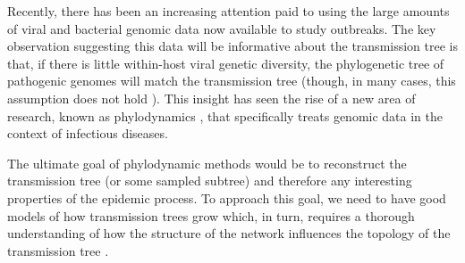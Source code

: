 \documentclass[review]{elsarticle}
\numberwithin{equation}{section}
\begin{document}
Recently, there has been an increasing attention paid to using the large amounts of viral and bacterial genomic data now available to study outbreaks.  
The key observation suggesting this data will be informative about the transmission tree is that, if there is little within-host viral genetic diversity, the phylogenetic tree of pathogenic genomes will match the transmission tree (though, in many cases, this assumption does not hold \citep{romero2015, ypma2013}).  
This insight has seen the rise of a new area of research, known as phylodynamics \citep{grenfell2004}, that specifically treats genomic data in the context of infectious diseases. 

The ultimate goal of phylodynamic methods would be to reconstruct the transmission tree (or some sampled subtree) and therefore any interesting properties of the epidemic process.  
To approach this goal, we need to have good models of how transmission trees grow which, in turn, requires a thorough understanding of how the structure of the network influences the topology of the transmission tree \citep{frost2015}. 
\end{document}
